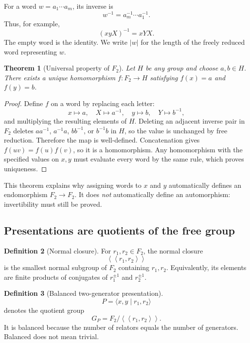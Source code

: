 \documentclass[11pt]{article}
\newtheorem{theorem}{Theorem}[section]
\theoremstyle{definition}
\newtheorem{definition}[theorem]{Definition}
\theoremstyle{remark}
\newcommand{\F}{F_2}
\newcommand{\Ncl}[1]{\left\langle\!\left\langle #1\right\rangle\!\right\rangle}
\newcommand{\len}[1]{\left|#1\right|}
\begin{document}
For a word \(w=a_1\cdots a_m\), its inverse is
\[
  w^{-1}=a_m^{-1}\cdots a_1^{-1}.
\]
Thus, for example,
\[
  (xyX)^{-1}=xYX.
\]
The empty word is the identity.  We write \(\len{w}\) for the length of the
freely reduced word representing \(w\).

\begin{theorem}[Universal property of \(\F\)]
\label{thm:universal}
Let \(H\) be any group and choose \(a,b\in H\).  There exists a unique
homomorphism \(f:\F\to H\) satisfying \(f(x)=a\) and \(f(y)=b\).
\end{theorem}

\begin{proof}
Define \(f\) on a word by replacing each letter:
\[
x\mapsto a,\quad X\mapsto a^{-1},\quad
y\mapsto b,\quad Y\mapsto b^{-1},
\]
and multiplying the resulting elements of \(H\).  Deleting an adjacent
inverse pair in \(\F\) deletes \(aa^{-1}\), \(a^{-1}a\), \(bb^{-1}\), or
\(b^{-1}b\) in \(H\), so the value is unchanged by free reduction.
Therefore the map is well-defined.  Concatenation gives
\(f(uv)=f(u)f(v)\), so it is a homomorphism.  Any homomorphism with the
specified values on \(x,y\) must evaluate every word by the same rule,
which proves uniqueness.
\end{proof}

This theorem explains why assigning words to \(x\) and \(y\) automatically
defines an endomorphism \(\F\to\F\).  It does \emph{not} automatically define
an automorphism: invertibility must still be proved.

\subsection{Presentations are quotients of the free group}

\begin{definition}[Normal closure]
For \(r_1,r_2\in\F\), the normal closure
\[
  \Ncl{r_1,r_2}
\]
is the smallest normal subgroup of \(\F\) containing \(r_1,r_2\).
Equivalently, its elements are finite products of conjugates of
\(r_1^{\pm1}\) and \(r_2^{\pm1}\).
\end{definition}

\begin{definition}[Balanced two-generator presentation]
\[
  P=\langle x,y\mid r_1,r_2\rangle
\]
denotes the quotient group
\[
  G_P=\F/\Ncl{r_1,r_2}.
\]
It is balanced because the number of relators equals the number of
generators.  Balanced does not mean trivial.
\end{definition}
\end{document}
